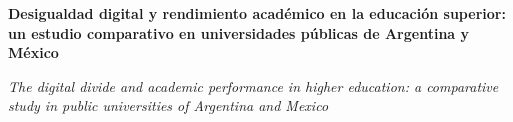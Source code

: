 \documentclass{article}
\renewcommand{\normalsize}{\fontsize{10pt}{13pt}\selectfont}
\newcommand{\articulotipo}{}
\newcommand{\articulotitulo}{}
\newcommand{\articulotitulotrans}{}
\newcommand{\articuloautores}{}
\newcommand{\articulodoi}{}
\newcommand{\articuloidiomaxml}{es}
\newcommand{\articulorevista}{}
\newcommand{\articuloissne}{}
\newcommand{\articulovolumen}{}
\newcommand{\articulonumero}{}
\newcommand{\articulofecha}{}
\newcommand{\articulopagina}{0}
\begin{document}

\renewcommand{\articuloidiomaxml}{es}
\renewcommand{\articulotitulo}{Desigualdad digital y rendimiento académico en la educación superior: un estudio comparativo en universidades públicas de Argentina y México}
\renewcommand{\articuloautores}{Georgina Berreta Invernizzi}
\renewcommand{\articulodoi}{10.18356/9789210029582c005}
\renewcommand{\articulotipo}{ARTÍCULO DE INVESTIGACIÓN}
\renewcommand{\articulorevista}{Blensera}
\renewcommand{\articuloissne}{2697-3650}
\renewcommand{\articulovolumen}{01}
\renewcommand{\articulonumero}{01}
\renewcommand{\articulofecha}{ 2026}
\renewcommand{\articulopagina}{1}

\setcounter{page}{1}
\thispagestyle{firstpage}

\noindent\begin{minipage}[t]{\dimexpr\textwidth+\marginparsep+\marginparwidth\relax}%
{\sffamily\bfseries\Large\articulotitulo\par}%
\end{minipage}\par
\vspace{3mm}%
\renewcommand{\articulotitulotrans}{The digital divide and academic performance in higher education: a comparative study in public universities of Argentina and Mexico}
\noindent\begin{minipage}[t]{\dimexpr\textwidth+\marginparsep+\marginparwidth\relax}%
{\sffamily\itshape\normalsize\articulotitulotrans\par}%
\end{minipage}\par
\vspace{4mm}%
\end{document}
